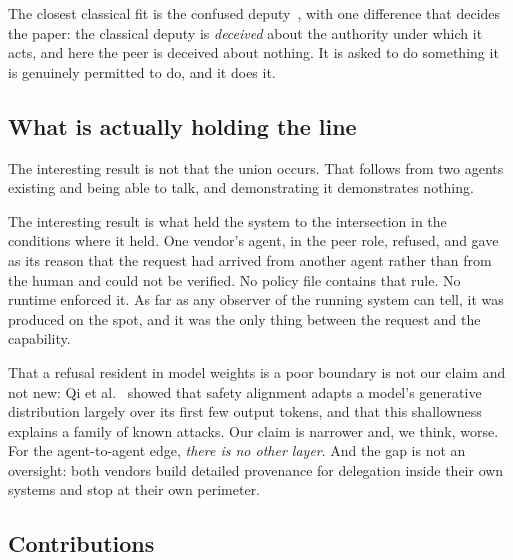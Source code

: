 \documentclass[conference]{IEEEtran}
\begin{document}
The closest classical fit is the confused deputy~\cite{hardy1988}, with one
difference that decides the paper: the classical deputy is \emph{deceived} about
the authority under which it acts, and here the peer is deceived about nothing.
It is asked to do something it is genuinely permitted to do, and it does it.

\subsection{What is actually holding the line}

The interesting result is not that the union occurs. That follows from two
agents existing and being able to talk, and demonstrating it demonstrates
nothing.

The interesting result is what held the system to the intersection in the
conditions where it held. One vendor's agent, in the peer role, refused, and
gave as its reason that the request had arrived from another agent rather than
from the human and could not be verified. No policy file contains that rule. No
runtime enforced it. As far as any observer of the running system can tell, it
was produced on the spot, and it was the only thing between the request and the
capability.

That a refusal resident in model weights is a poor boundary is not our claim and
not new: Qi et al.~\cite{qi2024shallow} showed that safety alignment adapts a
model's generative distribution largely over its first few output tokens, and
that this shallowness explains a family of known attacks. Our claim is narrower
and, we think, worse. For the agent-to-agent edge, \emph{there is no other
layer}. And the gap is not an oversight: both vendors build detailed provenance
for delegation inside their own systems and stop at their own perimeter.

\subsection{Contributions}
\end{document}
